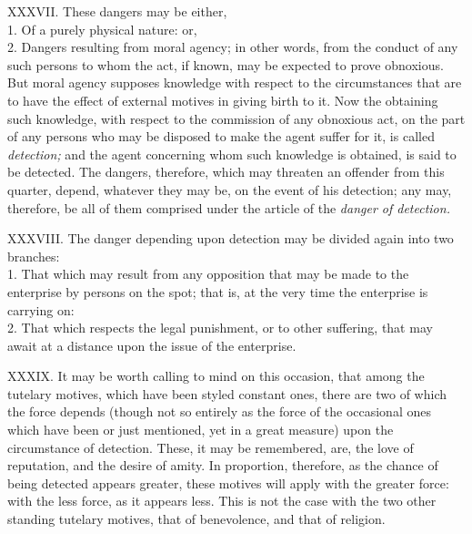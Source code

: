 \documentclass[12pt]{report}
\begin{document}
XXXVII. These dangers may be either,\\
1. Of a purely physical nature: or,\\
2. Dangers resulting from moral agency; in other words, from the conduct
of any such persons to whom the act, if known, may be expected to prove
obnoxious.\\
But moral agency supposes knowledge with respect to the circumstances
that are to have the effect of external motives in giving birth to it.
Now the obtaining such knowledge, with respect to the commission of any
obnoxious act, on the part of any persons who may be disposed to make
the agent suffer for it, is called \emph{detection;} and the agent
concerning whom such knowledge is obtained, is said to be detected. The
dangers, therefore, which may threaten an offender from this quarter,
depend, whatever they may be, on the event of his detection; any may,
therefore, be all of them comprised under the article of the
\emph{danger of detection.}

XXXVIII. The danger depending upon detection may be divided again into
two branches:\\
1. That which may result from any opposition that may be made to the
enterprise by persons on the spot; that is, at the very time the
enterprise is carrying on:\\
2. That which respects the legal punishment, or to other suffering, that
may await at a distance upon the issue of the enterprise.

XXXIX. It may be worth calling to mind on this occasion, that among the
tutelary motives, which have been styled constant ones, there are two of
which the force depends (though not so entirely as the force of the
occasional ones which have been or just mentioned, yet in a great
measure) upon the circumstance of detection. These, it may be
remembered, are, the love of reputation, and the desire of amity. In
proportion, therefore, as the chance of being detected appears greater,
these motives will apply with the greater force: with the less force, as
it appears less. This is not the case with the two other standing
tutelary motives, that of benevolence, and that of religion.
\end{document}
